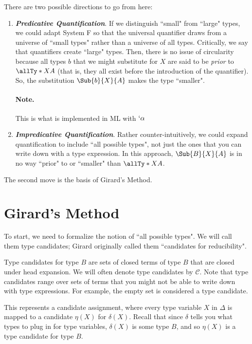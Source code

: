 \documentclass[letterpaper]{article}
\begin{document}
There are two possible directions to go from here:
\begin{enumerate}
    \item \textit{\textbf{Predicative Quantification}}. If we distinguish ``small" from ``large" types, we could adapt System F so that the universal quantifier draws from a universe of ``small types" rather than a universe of all types. Critically, we say that quantifiers create ``large" types. Then, there is no issue of circularity because all types $b$ that we might substitute for $X$ are said to be \textit{prior} to $\allTy*{X}{A}$ (that is, they all exist before the introduction of the quantifier). So, the substitution $\Sub{b}{X}{A}$ makes the type ``smaller".
    \paragraph{Note.} This is what is implemented in ML with $`\alpha$
    \item \textit{\textbf{Impredicative Quantification}}. Rather counter-intuitively, we could expand quantification to include ``all possible types", not just the ones that you can write down with a type expression. In this approach, $\Sub{B}{X}{A}$ is in no way ``prior" to or ``smaller" than $\allTy*{X}{A}$.
\end{enumerate}
The second move is the basis of Girard's Method.

\section{Girard's Method}
To start, we need to formalize the notion of  ``all possible types". We will call them type candidates; Girard originally called them ``candidates for reducibility".

\begin{definition}
Type candidates for type $B$ are sets of closed terms of type $B$ that are closed under head expansion. We will often denote type candidates by $\mathcal{C}$. Note that type candidates range over sets of terms that you might not be able to write down with type expressions. For example, the empty set is considered a type candidate.
\end{definition}

\begin{definition}[$\eta \subseteq \delta : \Delta$]
This represents a candidate assignment, where every type variable $X$ in $\Delta$ is mapped to a candidate $\eta(X)$ for $\delta(X)$. Recall that since $\delta$ tells you what types to plug in for type variables, $\delta(X)$ is some type $B$, and so $\eta(X)$ is a type candidate for type $B$.
\end{definition}
\end{document}
